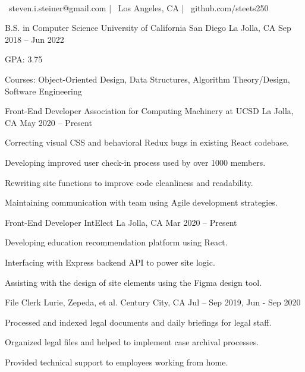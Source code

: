 \documentclass[]{awesome-cv}
\begin{document}
    
\begin{center}
	 \\
	\vspace{2mm}
	{\faEnvelope\ steven.i.steiner@gmail.com} | {\faMapMarker\ Los Angeles, CA} | {\faGithub\ github.com/steets250}
\end{center}

\begin{cventries}
	\cventry
	{B.S. in Computer Science}
	{University of California San Diego}
	{La Jolla, CA}
	{Sep 2018 – Jun 2022}
	{\begin{cvitems}
		\item {GPA: 3.75}
		\item {Courses: Object-Oriented Design, Data Structures, Algorithm Theory/Design, Software Engineering}
		\end{cvitems}}
\end{cventries}

\vspace{-5mm}

\begin{cventries}
\cventry
	{Front-End Developer}
	{Association for Computing Machinery at UCSD}
	{La Jolla, CA}
	{May 2020 – Present}
	{\begin{cvitems}
		\item {Correcting visual CSS and behavioral Redux bugs in existing React codebase.}
		\item {Developing improved user check-in process used by over 1000 members.}
		\item {Rewriting site functions to improve code cleanliness and readability.}
		\item {Maintaining communication with team using Agile development strategies. }
		\end{cvitems}}
	\cventry
	{Front-End Developer}
	{IntElect}
	{La Jolla, CA}
	{Mar 2020 – Present}
	{\begin{cvitems}
		\item {Developing education recommendation platform using React.}
		\item {Interfacing with Express backend API to power site logic.}
		\item {Assisting with the design of site elements using the Figma design tool.}
		\end{cvitems}}
	\cventry
	{File Clerk}
	{Lurie, Zepeda, et al.}
	{Century City, CA}
	{Jul – Sep 2019, Jun - Sep 2020}
	{\begin{cvitems}
		\item {Processed and indexed legal documents and daily briefings for legal staff.}
		\item {Organized legal files and helped to implement case archival processes.}
		\item {Provided technical support to employees working from home.}
		\end{cvitems}}
\end{cventries}
\end{document}
